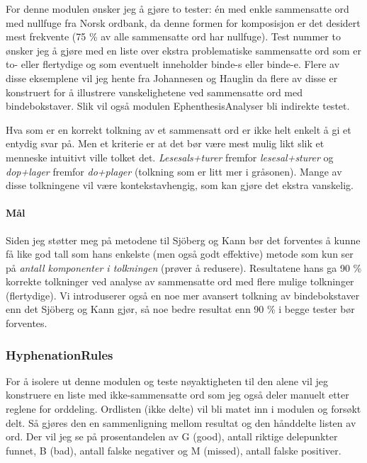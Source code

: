 For denne modulen ønsker jeg å gjøre to tester: én med enkle sammensatte ord med nullfuge fra Norsk ordbank, da denne formen for komposisjon er det desidert mest frekvente (75 \% av alle sammensatte ord har nullfuge\cite{johannessen1996automatic}). Test nummer to ønsker jeg å gjøre med en liste over ekstra problematiske sammensatte ord som er to- eller flertydige og som eventuelt inneholder binde-s eller binde-e. Flere av disse eksemplene vil jeg hente fra Johannesen og Hauglin \cite{johannessen1996automatic} da flere av disse er konstruert for å illustrere vanskelighetene ved sammensatte ord med bindebokstaver. Slik vil også modulen EphenthesisAnalyser bli indirekte testet.

Hva som er en korrekt tolkning av et sammensatt ord er ikke helt enkelt å gi et entydig svar på. Men et kriterie er at det bør være mest mulig likt slik et menneske intuitivt ville tolket det. \textit{Lesesals+turer} fremfor \textit{lesesal+sturer} og \textit{dop+lager} fremfor \textit{do+plager} (tolkning som er litt mer i gråsonen). Mange av disse tolkningene vil være kontekstavhengig, som kan gjøre det ekstra vanskelig.

\paragraph{Mål} Siden jeg støtter meg på metodene til Sjöberg og Kann \cite{sjobergh2004finding} bør det forventes å kunne få like god tall som hans enkelste (men også godt effektive) metode som kun ser på \textit{antall komponenter i tolkningen} (prøver å redusere). Resultatene hans ga 90 \% korrekte tolkninger ved analyse av sammensatte ord med flere mulige tolkninger (flertydige). Vi introduserer også en noe mer avansert tolkning av bindebokstaver enn det Sjöberg og Kann gjør, så noe bedre resultat enn 90 \% i begge tester bør forventes.

\subsubsection{HyphenationRules}

For å isolere ut denne modulen og teste nøyaktigheten til den alene vil jeg konstruere en liste med ikke-sammensatte ord som jeg også deler manuelt etter reglene for orddeling. Ordlisten (ikke delte) vil bli matet inn i modulen og forsøkt delt. Så gjøres den en sammenligning mellom resultat og den hånddelte listen av ord. Der vil jeg se på prosentandelen av G (good), antall riktige delepunkter funnet, B (bad), antall falske negativer og M (missed), antall falske positiver.


